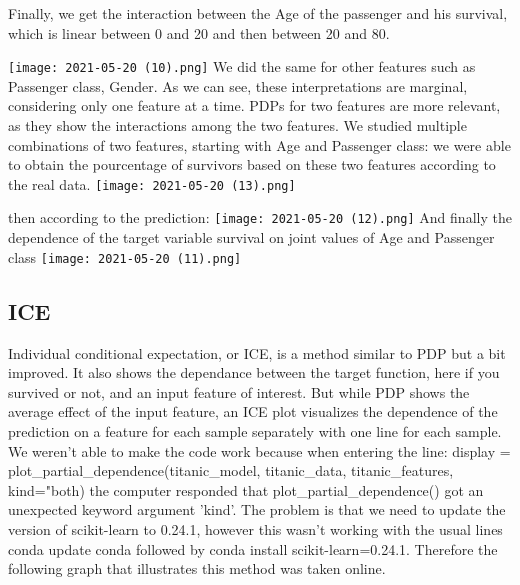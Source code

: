 \documentclass[sigplan,screen]{acmart}
\begin{document}
Finally, we get the interaction between the Age of the passenger and his survival, which is linear between 0 and 20 and then between 20 and 80.

\centering
      \texttt{[image: 2021-05-20 (10).png]}
We did the same for other features such as Passenger class, Gender. As we can see, these interpretations are marginal, considering only one feature at a time. PDPs for two features are more relevant, as they show the interactions among the two features. We studied multiple combinations of two features, starting with Age and Passenger class: we were able to obtain the pourcentage of survivors based on these two features according to the real data.
\centering
      \texttt{[image: 2021-05-20 (13).png]}
      
    then according to the prediction:
\centering    
      \texttt{[image: 2021-05-20 (12).png]}
And finally the dependence of the target variable survival on joint values of Age and Passenger class
\centering
      \texttt{[image: 2021-05-20 (11).png]}
\subsection{ICE}
Individual conditional expectation, or ICE, is a method similar to PDP but a bit improved. It also shows the dependance between the target function, here if you survived or not, and an input feature of interest. But while PDP shows the average effect of the input feature, an ICE plot visualizes the dependence of the prediction on a feature for each sample separately with one line for each sample.
We weren't able to make the code work because when entering the line: display = plot_partial_dependence(titanic_model, titanic_data, titanic_features, kind="both) the computer responded that  plot_partial_dependence() got an unexpected keyword argument 'kind'. The problem is that we need to update the version of scikit-learn to 0.24.1, however this wasn't working with the usual lines conda update conda followed by conda install scikit-learn=0.24.1.
Therefore the following graph that illustrates this method was taken online.
\end{document}
